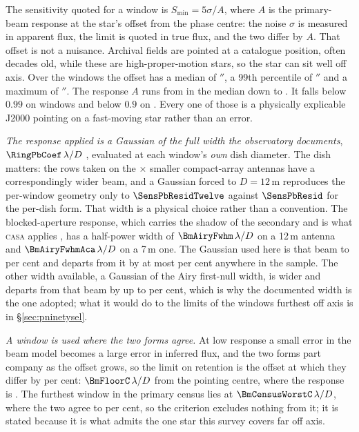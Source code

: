 The sensitivity quoted for a window is $S_{\min}=5\sigma/A$, where $A$ is the
primary-beam response at the star's offset from the phase centre: the noise
$\sigma$ is measured in apparent flux, the limit is quoted in true flux, and
the two differ by $A$. That offset is not a nuisance. Archival fields are
pointed at a catalogue position, often decades old, while these are
high-proper-motion stars, so the star can sit well off axis. Over the
\PbNWin{} windows the offset has a median of \PbOffMed$''$, a 99th
percentile of \PbOffPNN$''$ and a maximum of \BmOffMax$''$. The response $A$
runs from \BmRespMed{} in the median down to \BmRespMin. It falls below $0.99$
on \PbNLowNN{} windows and below $0.9$ on \BmNBelowNine. Every one
of those is a physically explicable J2000 pointing on a
fast-moving star rather than an error.

\emph{The response applied is a Gaussian of the full width the observatory
documents}, $\RingPbCoef\,\lambda/D$ \citep{ALMAHandbook}, evaluated at each
window's \emph{own} dish diameter. The dish matters: the \PbNAcaRow{} rows
taken on the \PbAcaRatio$\times$ smaller compact-array antennas have a
correspondingly wider beam, and a Gaussian forced to $D=12$\,m reproduces the
per-window geometry only to $\SensPbResidTwelve$ against $\SensPbResid$ for
the per-dish form. That width is a physical choice rather than a convention.
The blocked-aperture response, which carries the shadow of the secondary and
is what \textsc{casa} applies \citep{CASA2022}, has a half-power
width of $\BmAiryFwhm\,\lambda/D$ on a 12\,m antenna and
$\BmAiryFwhmAca\,\lambda/D$ on a 7\,m one. The Gaussian used here is that
beam to \BmDocAiryPct{} per cent and departs from it by at most
\BmModelMaxPct{} per cent anywhere in the sample. The other width available,
a Gaussian of the Airy first-null width, is wider and departs from that beam
by up to \BmModelMaxNullPct{} per cent, which is why the documented width is
the one adopted; what it would do to the limits of the windows furthest off
axis is in \S\ref{sec:pninetysel}.

\emph{A window is used where the two forms agree.} At low response a small
error in the beam model becomes a large error in inferred flux, and the two
forms part company as the offset grows, so the limit on retention is the
offset at which they differ by \BmFloorTolPct{} per cent:
$\BmFloorC\,\lambda/D$ from the pointing centre, where the response is
\BmFloorResp. The furthest window in the primary census lies at
$\BmCensusWorstC\,\lambda/D$, where the two agree to \BmCensusWorstPct{} per
cent, so the criterion excludes nothing from it; it is stated because it is
what admits the one star this survey covers far off axis.

